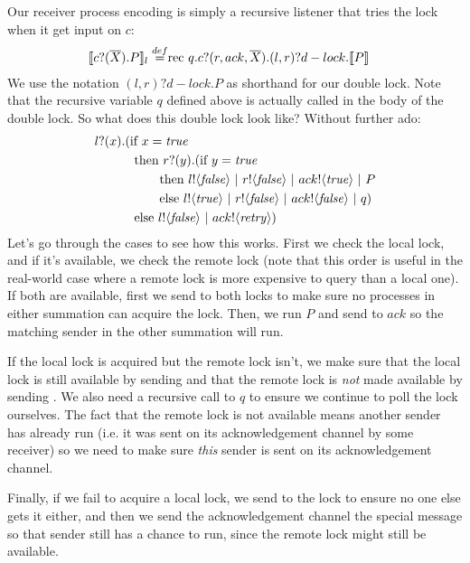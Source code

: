 Our receiver process encoding is simply a recursive listener that tries the lock when it get input on $c$:
\begin{equation*}\begin{split}
	\llbracket{ \ensuremath{{c}?({\overline{X}}).} P}\rrbracket_l \overset{\tiny{def}}{=} & \text{rec }{q}.{c}?({r,ack,\overline{X}}). (l,r)?d-lock.\llbracket{P}\rrbracket
\end{split}\end{equation*}
We use the notation $(l,r)?d-lock.P$ as shorthand for our double lock.
Note that the recursive variable $q$ defined above is actually called in the body of the double lock.
So what does this double lock look like?  Without further ado:
\begin{equation}\begin{split}
	{l}?({x}).(&\text{if } {x= \ensuremath{\text{\emph{true}}} }\\
	&\text{ then } {r}?({y}). (\text{if } {y= \ensuremath{\text{\emph{true}}} }\\
	&\ \ \ \ \ \ \text{ then } {l}!\langle{ \ensuremath{\text{\emph{false}}} }\rangle \ |\  {r}!\langle{ \ensuremath{\text{\emph{false}}} }\rangle \ |\  {ack}!\langle{ \ensuremath{\text{\emph{true}}} }\rangle \ |\  P\\
	&\ \ \ \ \ \ \text{ else } {l}!\langle{ \ensuremath{\text{\emph{true}}} }\rangle \ |\  {r}!\langle{ \ensuremath{\text{\emph{false}}} }\rangle \ |\  {ack}!\langle{ \ensuremath{\text{\emph{false}}} }\rangle \ |\  q)\\
	&\text{ else }{l}!\langle{ \ensuremath{\text{\emph{false}}} }\rangle \ |\  {ack}!\langle{ \ensuremath{\text{\emph{retry}}} }\rangle)\\
\end{split}\end{equation}%
Let's go through the cases to see how this works.  
First we check the local lock, and if it's available, we check the remote lock (note that this order is useful in the real-world case where a remote lock is more expensive to query than a local one).  
If both are available, first we send \pfalse to both locks to make sure no processes in either summation can acquire the lock.  
Then, we run $P$ and send \ptrue to $ack$ so the matching sender in the other summation will run.

If the local lock is acquired but the remote lock isn't, we make sure that the local lock is still available by sending  and that the remote lock is \emph{not} made available by sending .  
We also need a recursive call to $q$ to ensure we continue to poll the lock ourselves.  
The fact that the remote lock is not available means another sender has already run (i.e. it was sent \ptrue on its acknowledgement channel by some receiver) so we need to make sure \emph{this} sender is sent \pfalse on its acknowledgement channel.

Finally, if we fail to acquire a local lock, we send \pfalse to the lock to ensure no one else gets it either, and then we send the acknowledgement channel the special message \pretry so that sender still has a chance to run, since the remote lock might still be available.

